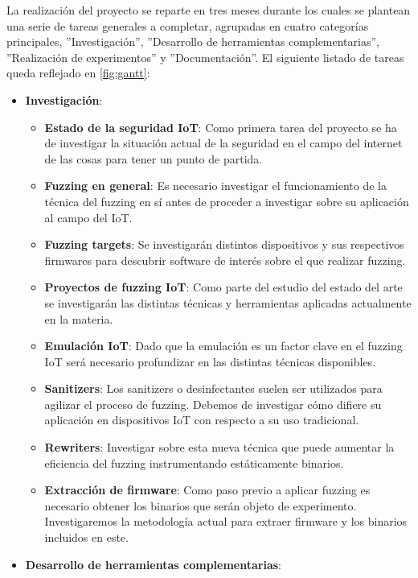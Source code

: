 La realización del proyecto se reparte en tres meses durante los cuales se plantean una serie de tareas generales a completar,
agrupadas en cuatro categorías principales, ''Investigación'', ''Desarrollo de herramientas complementarias'', ''Realización de 
experimentos'' y ''Documentación''. El siguiente listado de tareas queda reflejado en \ref{fig:gantt}:
\begin{itemize}
    \item \textbf{Investigación}: 
    \begin{itemize}
        \item \textbf{Estado de la seguridad IoT}: Como primera tarea del proyecto se ha de investigar la situación actual de la seguridad
        en el campo del internet de las cosas para tener un punto de partida.
        \item \textbf{Fuzzing en general}: Es necesario investigar el funcionamiento de la técnica del fuzzing en sí antes de proceder a 
        investigar sobre su aplicación al campo del IoT.
        \item \textbf{Fuzzing targets}: Se investigarán distintos dispositivos y sus respectivos firmwares para descubrir software de interés
        sobre el que realizar fuzzing.
        \item \textbf{Proyectos de fuzzing IoT}: Como parte del estudio del estado del arte se investigarán las distintas técnicas y herramientas 
        aplicadas actualmente en la materia.
        \item \textbf{Emulación IoT}: Dado que la emulación es un factor clave en el fuzzing IoT será necesario profundizar en las distintas 
        técnicas disponibles.
        \item \textbf{Sanitizers}: Los sanitizers o desinfectantes suelen ser utilizados para agilizar el proceso de fuzzing. Debemos de investigar cómo difiere
        su aplicación en dispositivos IoT con respecto a su uso tradicional.
        \item \textbf{Rewriters}: Investigar sobre esta nueva técnica que puede aumentar la eficiencia del fuzzing instrumentando estáticamente binarios.
        \item \textbf{Extracción de firmware}: Como paso previo a aplicar fuzzing es necesario obtener los binarios que serán objeto de
        experimento. Investigaremos la metodología actual para extraer firmware y los binarios incluidos en este.
    \end{itemize}
    \item \textbf{Desarrollo de herramientas complementarias}:

\end{itemize}
